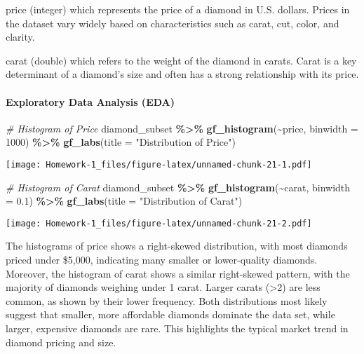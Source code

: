 \documentclass[
]{article}
\newenvironment{Shaded}{\begin{snugshade}}{\end{snugshade}}
\newcommand{\AttributeTok}[1]{\textcolor[rgb]{0.13,0.29,0.53}{#1}}
\newcommand{\CommentTok}[1]{\textcolor[rgb]{0.56,0.35,0.01}{\textit{#1}}}
\newcommand{\DecValTok}[1]{\textcolor[rgb]{0.00,0.00,0.81}{#1}}
\newcommand{\FloatTok}[1]{\textcolor[rgb]{0.00,0.00,0.81}{#1}}
\newcommand{\FunctionTok}[1]{\textcolor[rgb]{0.13,0.29,0.53}{\textbf{#1}}}
\newcommand{\NormalTok}[1]{#1}
\newcommand{\SpecialCharTok}[1]{\textcolor[rgb]{0.81,0.36,0.00}{\textbf{#1}}}
\newcommand{\StringTok}[1]{\textcolor[rgb]{0.31,0.60,0.02}{#1}}
\begin{document}
price (integer) which represents the price of a diamond in U.S. dollars.
Prices in the dataset vary widely based on characteristics such as
carat, cut, color, and clarity.

carat (double) which refers to the weight of the diamond in carats.
Carat is a key determinant of a diamond's size and often has a strong
relationship with its price.

\paragraph{Exploratory Data Analysis
(EDA)}\label{exploratory-data-analysis-eda}

\begin{Shaded}
\begin{Highlighting}[]
\CommentTok{\# Histogram of Price}
\NormalTok{diamond\_subset }\SpecialCharTok{\%\textgreater{}\%}
  \FunctionTok{gf\_histogram}\NormalTok{(}\SpecialCharTok{\textasciitilde{}}\NormalTok{price, }\AttributeTok{binwidth =} \DecValTok{1000}\NormalTok{) }\SpecialCharTok{\%\textgreater{}\%}
  \FunctionTok{gf\_labs}\NormalTok{(}\AttributeTok{title =} \StringTok{"Distribution of Price"}\NormalTok{)}
\end{Highlighting}
\end{Shaded}

\texttt{[image: Homework-1\_files/figure-latex/unnamed-chunk-21-1.pdf]}

\begin{Shaded}
\begin{Highlighting}[]
\CommentTok{\# Histogram of Carat}
\NormalTok{diamond\_subset }\SpecialCharTok{\%\textgreater{}\%}
  \FunctionTok{gf\_histogram}\NormalTok{(}\SpecialCharTok{\textasciitilde{}}\NormalTok{carat, }\AttributeTok{binwidth =} \FloatTok{0.1}\NormalTok{) }\SpecialCharTok{\%\textgreater{}\%}
  \FunctionTok{gf\_labs}\NormalTok{(}\AttributeTok{title =} \StringTok{"Distribution of Carat"}\NormalTok{)}
\end{Highlighting}
\end{Shaded}

\texttt{[image: Homework-1\_files/figure-latex/unnamed-chunk-21-2.pdf]}

The histograms of price shows a right-skewed distribution, with most
diamonds priced under \$5,000, indicating many smaller or lower-quality
diamonds. Moreover, the histogram of carat shows a similar right-skewed
pattern, with the majority of diamonds weighing under 1 carat. Larger
carats (\textgreater2) are less common, as shown by their lower
frequency. Both distributions most likely suggest that smaller, more
affordable diamonds dominate the data set, while larger, expensive
diamonds are rare. This highlights the typical market trend in diamond
pricing and size.
\end{document}
